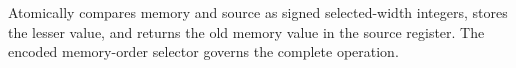 Atomically compares memory and source as signed selected-width integers, stores the lesser value, and returns the
old memory value in the source register. The encoded memory-order selector governs the complete operation.
